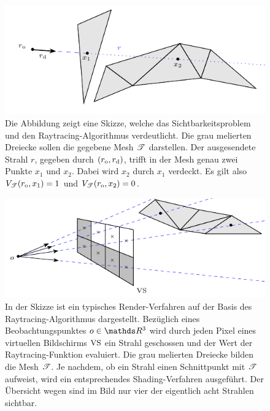 		\begin{figure}
			\center
			\includegraphics{gg_fig/ray_tracing_1.pdf}
			\caption[Skizze des Sichtbarkeitsproblems und des Raytracing-Verfahrens]{Die Abbildung zeigt eine Skizze, welche das Sichtbarkeitsproblem und den Raytracing-Algorithmus verdeutlicht. Die grau melierten Dreiecke sollen die gegebene Mesh $\mathscr{T}$ darstellen. Der ausgesendete Strahl $r$, gegeben durch $(r_{\mathrm{o}},r_{\mathrm{d}})$, trifft in der Mesh genau zwei Punkte $x_1$ und $x_2$. Dabei wird $x_2$ durch $x_1$ verdeckt. Es gilt also $V_{\mathscr{T}}(r_{\mathrm{o}},x_1)=1$ und $V_{\mathscr{T}}(r_{\mathrm{o}},x_2)=0$.}
			\label{fig:ray_tracing-1}
		\end{figure}

		\begin{figure}
			\center
			\includegraphics{gg_fig/ray_tracing_2.pdf}
			\caption[Raytracing als Render-Verfahren]{In der Skizze ist ein typisches Render-Verfahren auf der Basis des Raytracing-Algorithmus dargestellt. Bezüglich eines Beobachtungspunktes $o\in\SR^3$ wird durch jeden Pixel eines virtuellen Bildschirms $\mathrm{VS}$ ein Strahl geschossen und der Wert der Raytracing-Funktion evaluiert. Die grau melierten Dreiecke bilden die Mesh $\mathscr{T}$. Je nachdem, ob ein Strahl einen Schnittpunkt mit $\mathscr{T}$ aufweist, wird ein entsprechendes Shading-Verfahren ausgeführt. Der Übersicht wegen sind im Bild nur vier der eigentlich acht Strahlen sichtbar.}
			\label{fig:ray_tracing-2}
		\end{figure}

